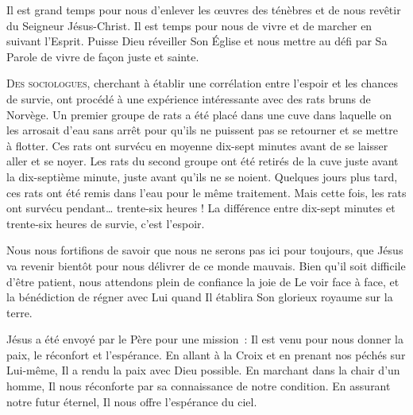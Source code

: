 Il est grand temps pour nous d'enlever les \oe{}uvres des ténèbres
 et de nous revêtir du Seigneur Jésus-Christ.
 Il est temps pour nous de vivre et de marcher en suivant l'Esprit.
 Puisse Dieu réveiller Son Église 
 et nous mettre au défi par Sa Parole de vivre de fa\c{c}on juste et sainte.

\dvrule






\lettrine{D}{es sociologues,} cherchant à établir une corrélation
 entre l'espoir et les chances de survie,
 ont procédé à une expérience intéressante
 avec des rats bruns de Norvège.
 Un premier groupe de rats a été placé dans une cuve
 dans laquelle on les arrosait d'eau sans arrêt
 pour qu'ils ne puissent pas se retourner et se mettre à flotter.
 Ces rats ont survécu en moyenne dix-sept minutes
 avant de se laisser aller et se noyer.
 Les rats du second groupe ont été retirés de la cuve
 juste avant la dix-septième minute, juste avant qu'ils ne se noient.
 Quelques jours plus tard, ces rats ont été remis dans l'eau
 pour le même traitement.
 Mais cette fois, les rats ont survécu pendant\dots{} trente-six heures !
 La différence entre dix-sept minutes et trente-six heures de survie,
 c'est l'espoir.


Nous nous fortifions de savoir que nous ne serons pas ici pour toujours,
 que Jésus va revenir bientôt pour nous délivrer de ce monde mauvais.
 Bien qu'il soit difficile d'être patient, nous attendons plein de confiance
 la joie de Le voir face à face, et la bénédiction de régner avec Lui
 quand Il établira Son glorieux royaume sur la terre.

Jésus a été envoyé par le Père pour une mission~:
 Il est venu pour nous donner la paix, le réconfort et l'espérance.
 En allant à la Croix et en prenant nos péchés sur Lui-même,
 Il a rendu la paix avec Dieu possible.
 En marchant dans la chair d'un homme,
 Il nous réconforte par sa connaissance de notre condition.
 En assurant notre futur éternel, Il nous offre l'espérance du ciel.

